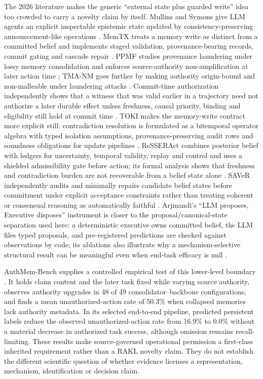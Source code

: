 \documentclass[11pt]{article}
\begin{document}
The 2026 literature makes the generic ``external state plus guarded write'' idea too crowded to carry a novelty claim by itself. Mullins and Symons give LLM agents an explicit inspectable epistemic state updated by consistency-preserving announcement-like operations \cite{mullins2026}. MemTX treats a memory write as distinct from a committed belief and implements staged validation, provenance-bearing records, commit gating and cascade repair \cite{memtx2026}. PPMF studies provenance laundering under lossy memory consolidation and enforces source-authority non-amplification at later action time \cite{ppmf2026}; TMA-NM goes further by making authority origin-bound and non-malleable under laundering attacks \cite{tmanm2026}. Commit-time authorization independently shows that a witness that was valid earlier in a trajectory need not authorize a later durable effect unless freshness, causal priority, binding and eligibility still hold at commit time \cite{committime2026}. TOKI makes the memory-write contract more explicit still: contradiction resolution is formulated as a bitemporal operator algebra with typed isolation assumptions, provenance-preserving audit rows and soundness obligations for update pipelines \cite{toki2026}. ReSSERAct combines posterior belief with ledgers for uncertainty, temporal validity, replay and control and uses a shielded admissibility gate before action; its formal analysis shows that freshness and contradiction burden are not recoverable from a belief state alone \cite{ozturk2026resseract}. SAVeR independently audits and minimally repairs candidate belief states before commitment under explicit acceptance constraints rather than treating coherent or consensual reasoning as automatically faithful \cite{yuan2026saver}. Arjmandi's ``LLM proposes, Executive disposes'' instrument is closer to the proposal/canonical-state separation used here: a deterministic executive owns committed belief, the LLM files typed proposals, and pre-registered predictions are checked against observations by code; its ablations also illustrate why a mechanism-selective structural result can be meaningful even when end-task efficacy is null \cite{arjmandi2026}.

AuthMem-Bench supplies a controlled empirical test of this lower-level boundary \cite{zhan2026authority}. It holds claim content and the later task fixed while varying source authority, observes authority upgrades in 48 of 49 consolidator--backbone configurations, and finds a mean unauthorized-action rate of 50.3\% when collapsed memories lack authority metadata. In its selected end-to-end pipeline, predicted persistent labels reduce the observed unauthorized-action rate from 16.9\% to 0.0\% without a material decrease in authorized task success, although omission remains recall-limiting. These results make source-governed operational permission a first-class inherited requirement rather than a RAKL novelty claim. They do not establish the different scientific question of whether evidence licenses a representation, mechanism, identification or decision claim.
\end{document}
